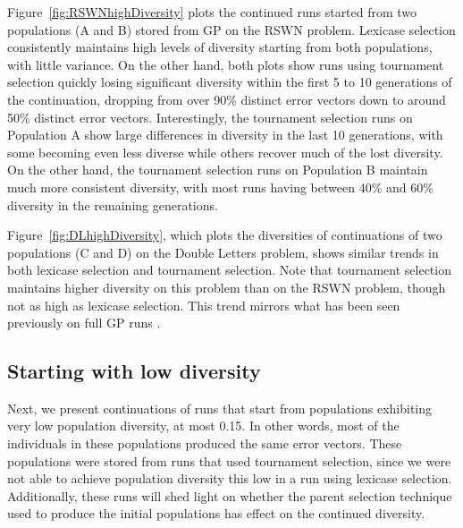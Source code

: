 \documentclass{sig-alternate-05-2015}
\begin{document}
Figure~\ref{fig:RSWNhighDiversity} plots the continued runs started from two populations (A and B) stored from GP on the RSWN problem. Lexicase selection consistently maintains high levels of diversity starting from both populations, with little variance. On the other hand, both plots show runs using tournament selection quickly losing significant diversity within the first 5 to 10 generations of the continuation, dropping from over 90\% distinct error vectors down to around 50\% distinct error vectors. Interestingly, the tournament selection runs on Population A show large differences in diversity in the last 10 generations, with some becoming even less diverse while others recover much of the lost diversity. On the other hand, the tournament selection runs on Population B maintain much more consistent diversity, with most runs having between 40\% and 60\% diversity in the remaining generations.

Figure~\ref{fig:DLhighDiversity}, which plots the diversities of continuations of two populations (C and D) on the Double Letters problem, shows similar trends in both lexicase selection and tournament selection. Note that tournament selection maintains higher diversity on this problem than on the RSWN problem, though not as high as lexicase selection. This trend mirrors what has been seen previously on full GP runs \cite{Helmuth:2015:GPTP}.




\subsection{Starting with low diversity}
\label{sec:lowDiversityResults}

Next, we present continuations of runs that start from populations exhibiting very low population diversity, at most 0.15. In other words, most of the individuals in these populations produced the same error vectors. These populations were stored from runs that used tournament selection, since we were not able to achieve population diversity this low in a run using lexicase selection. Additionally, these runs will shed light on whether the parent selection technique used to produce the initial populations has effect on the continued diversity.
\end{document}
